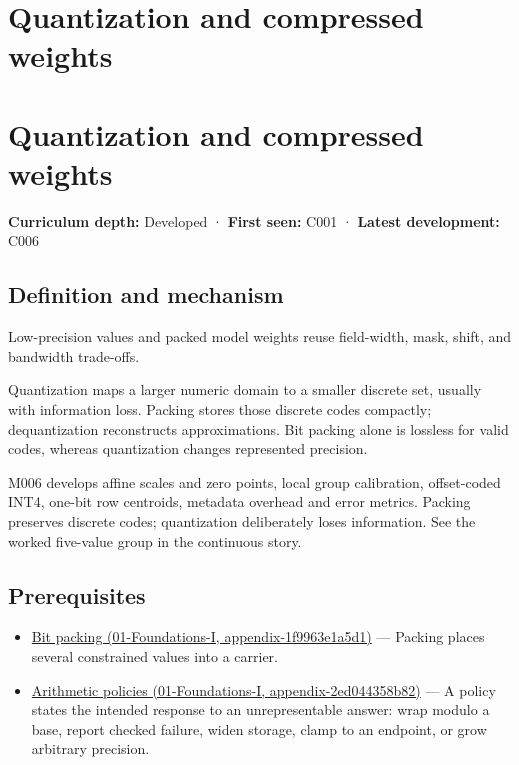 \hypertarget{appendix-fdc7879e8bf2}{}
\section*{Quantization and compressed weights}
\section{Quantization and compressed weights}\label{quantization-and-compressed-weights}

\textbf{Curriculum depth:} Developed · \textbf{First seen:} C001 · \textbf{Latest development:} C006

\subsection{Definition and mechanism}\label{definition-and-mechanism}

Low-precision values and packed model weights reuse field-width, mask, shift, and bandwidth trade-offs.

Quantization maps a larger numeric domain to a smaller discrete set, usually with information loss. Packing stores those discrete codes compactly; dequantization reconstructs approximations. Bit packing alone is lossless for valid codes, whereas quantization changes represented precision.

M006 develops affine scales and zero points, local group calibration, offset-coded INT4, one-bit row centroids, metadata overhead and error metrics. Packing preserves discrete codes; quantization deliberately loses information. See the worked five-value group in the continuous story.

\subsection{Prerequisites}\label{prerequisites}

\begin{itemize}
\tightlist
\item
  \href{}{Bit packing (01-Foundations-I, appendix-1f9963e1a5d1)} --- Packing places several constrained values into a carrier.
\item
  \href{}{Arithmetic policies (01-Foundations-I, appendix-2ed044358b82)} --- A policy states the intended response to an unrepresentable answer: wrap modulo a base, report checked failure, widen storage, clamp to an endpoint, or grow arbitrary precision.
\end{itemize}

